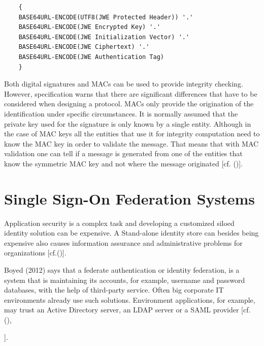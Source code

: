 {	
	\begin{lstlisting}
	{
	BASE64URL-ENCODE(UTF8(JWE Protected Header)) '.'
	BASE64URL-ENCODE(JWE Encrypted Key) '.'
	BASE64URL-ENCODE(JWE Initialization Vector) '.'
	BASE64URL-ENCODE(JWE Ciphertext) '.'
	BASE64URL-ENCODE(JWE Authentication Tag)
	}
	\end{lstlisting}
	
	Both digital signatures and MACs can be used to provide integrity checking. However, specification warns that there are significant differences that have to be considered when designing a protocol. MACs only provide the origination of the identification under specific circumstances. It is normally assumed that the private key used for the signature is only known by a single entity. Although in the case of MAC keys all the entities that use it for integrity computation need to know the MAC key in order to validate the message. That means that with MAC validation one can tell if a message is generated from one of the entities that know the symmetric MAC key and not where the message originated [cf. (\cite{JWT:IETF:Jones:2015})].	

	
\section{Single Sign-On Federation Systems}

Application security is a complex task and developing a customized siloed identity solution can be expensive. A Stand-alone identity store can besides being expensive also causes information assurance and administrative problems for organizations  [cf.(\cite{JerichoSystems:IS})]. 

Boyed (2012) says that a federate authentication or identity federation, is a system that is maintaining its accounts, for example, username and password databases, with the help of third-party service. Often big corporate IT environments already use such solutions. Environment applications, for example, may trust an Active Directory server, an LDAP server or a SAML provider [cf. (\cite{Birell:2013:FIMS}), {\cite{Boyed:2012:GSOA}].
	
}}
